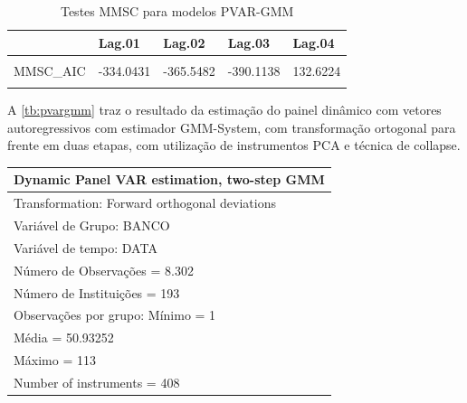 \documentclass[
  12pt,
  12pt,
  openright,
  oneside,
  a4paper,
  chapter=TITLE,
  section=TITLE,
  subsection=TITLE,
  subsubsection=TITLE,
  english,
  portugues,
  sumario=tradicional]{abntex2}
\begin{document}
\begin{table}[!hbtp]
\caption{Testes MMSC para modelos PVAR-GMM}
\vspace{-1mm}
\begingroup\fontsize{10}{12}\selectfont

\begin{tabu} to 
\toprule
  & Lag.01 & Lag.02 & Lag.03 & Lag.04\\
\midrule
{} &  &  &  & \\
MMSC\_AIC & -334.0431 & -365.5482 & -390.1138 & 132.6224\\
 &  &  &  & \\
\bottomrule
\end{tabu}
\endgroup{}
\vspace{1mm}
\label{tb:mmsc}
\vspace{-2mm}
\end{table}

A \autoref{tb:pvargmm} traz o resultado da estimação do painel dinâmico com vetores autoregressivos com estimador GMM-System, com transformação ortogonal para frente em duas etapas, com utilização de instrumentos PCA e técnica de collapse.

\vspace{20pt}
\vspace{-1mm}

\begin{longtable}[]{@{}l@{}}
\toprule
Dynamic Panel VAR estimation, two-step GMM \\
\midrule
\endhead
Transformation: Forward orthogonal deviations \\
Variável de Grupo: BANCO \\
Variável de tempo: DATA \\
Número de Observações = 8.302 \\
Número de Instituições = 193 \\
Observações por grupo: Mínimo = 1 \\
Média = 50.93252 \\
Máximo = 113 \\
Number of instruments = 408 \\
\bottomrule
\end{longtable}
\end{document}
